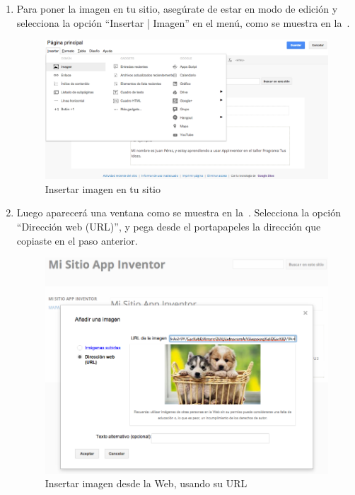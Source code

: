 \documentclass[letterpaper]{article}
\begin{document}
\begin{enumerate}
\item Para poner la imagen en tu sitio, asegúrate de estar en modo de
  edición y selecciona la opción ``Insertar | Imagen'' en el menú,
  como se muestra en la~.

\begin{figure}[H]
\centering
\includegraphics[scale=0.25]{figures/SiteAddImage1}
\caption{Insertar imagen en tu sitio}
\label{fig:SiteAddImage1}
\end{figure}

\item Luego aparecerá una ventana como se muestra en
  la~. Selecciona la opción ``Dirección web
  (URL)'', y pega desde el portapapeles la dirección que copiaste en
  el paso anterior.

\begin{figure}[H]
\centering
\includegraphics[scale=0.25]{figures/SiteAddImage3}
\caption{Insertar imagen desde la Web, usando su URL}
\label{fig:SiteAddImage3}
\end{figure}


\end{enumerate}
\end{document}
